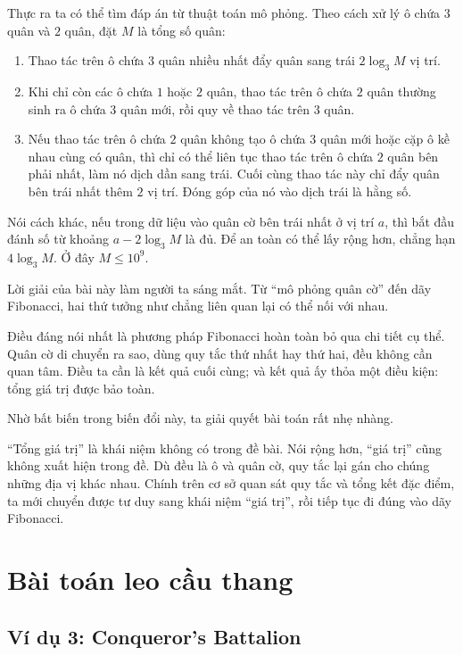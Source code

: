 \documentclass[11pt]{article}
\begin{document}
Thực ra ta có thể tìm đáp án từ thuật toán mô phỏng. Theo cách xử lý ô chứa
\(3\) quân và \(2\) quân, đặt \(M\) là tổng số quân:
\begin{enumerate}
  \item Thao tác trên ô chứa \(3\) quân nhiều nhất đẩy quân sang trái
  \(2\log_3 M\) vị trí.
  \item Khi chỉ còn các ô chứa \(1\) hoặc \(2\) quân, thao tác trên ô chứa
  \(2\) quân thường sinh ra ô chứa \(3\) quân mới, rồi quy về thao tác trên
  \(3\) quân.
  \item Nếu thao tác trên ô chứa \(2\) quân không tạo ô chứa \(3\) quân mới
  hoặc cặp ô kề nhau cùng có quân, thì chỉ có thể liên tục thao tác trên ô
  chứa \(2\) quân bên phải nhất, làm nó dịch dần sang trái. Cuối cùng thao tác
  này chỉ đẩy quân bên trái nhất thêm \(2\) vị trí. Đóng góp của nó vào dịch
  trái là hằng số.
\end{enumerate}
Nói cách khác, nếu trong dữ liệu vào quân cờ bên trái nhất ở vị trí \(a\), thì
bắt đầu đánh số từ khoảng \(a-2\log_3 M\) là đủ. Để an toàn có thể lấy rộng
hơn, chẳng hạn \(4\log_3 M\). Ở đây \(M\le 10^9\).

Lời giải của bài này làm người ta sáng mắt. Từ ``mô phỏng quân cờ'' đến dãy
Fibonacci, hai thứ tưởng như chẳng liên quan lại có thể nối với nhau.

Điều đáng nói nhất là phương pháp Fibonacci hoàn toàn bỏ qua chi tiết cụ thể.
Quân cờ di chuyển ra sao, dùng quy tắc thứ nhất hay thứ hai, đều không cần
quan tâm. Điều ta cần là kết quả cuối cùng; và kết quả ấy thỏa một điều kiện:
tổng giá trị được bảo toàn.

Nhờ bất biến trong biến đổi này, ta giải quyết bài toán rất nhẹ nhàng.

``Tổng giá trị'' là khái niệm không có trong đề bài. Nói rộng hơn, ``giá trị''
cũng không xuất hiện trong đề. Dù đều là ô và quân cờ, quy tắc lại gán cho
chúng những địa vị khác nhau. Chính trên cơ sở quan sát quy tắc và tổng kết
đặc điểm, ta mới chuyển được tư duy sang khái niệm ``giá trị'', rồi tiếp tục
đi đúng vào dãy Fibonacci.

\section{Bài toán leo cầu thang}

\subsection*{Ví dụ 3: Conqueror's Battalion}
\end{document}
